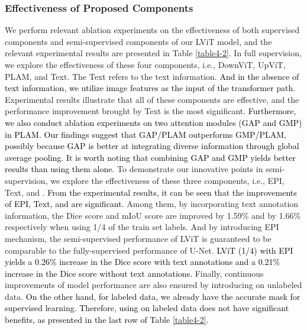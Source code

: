 \documentclass[lettersize,journal]{IEEEtran}
\begin{document}
\subsubsection{Effectiveness of Proposed Components}
We perform relevant ablation experiments on the effectiveness of both supervised components and semi-supervised components of our LViT model, and the relevant experimental results are presented in Table \ref{table4-2}. In full supervision, we explore the effectiveness of these four components, i.e., DownViT, UpViT, PLAM, and Text. The Text refers to the text information. 
\textcolor{black}{And in the absence of text information, we utilize image features as the input of the transformer path.}
Experimental results illustrate that all of these components are effective, and the performance improvement brought by Text is the most significant.
\textcolor{black}{
Furthermore, we also conduct ablation experiments on two attention modules (GAP and GMP) in PLAM. Our findings suggest that GAP/PLAM outperforms GMP/PLAM, possibly because GAP is better at integrating  diverse information through global average pooling. It is worth noting that combining GAP and GMP yields better results than using them alone.}
To demonstrate our innovative points in semi-supervision, we explore the effectiveness of these three components, i.e., EPI, Text, and . \textcolor{black}{From the experimental results, it can be seen that the improvements of EPI, Text, and  are significant.} Among them, by incorporating text annotation information, the Dice score and mIoU score are improved by 1.59\% and by 1.66\% respectively when using 1/4 of the train set labels. And by introducing EPI mechanism, the semi-supervised performance of LViT is guaranteed to be comparable to the fully-supervised performance of U-Net. \textcolor{black}{LViT (1/4) with EPI yields a 0.26\% increase in the Dice score with text annotations and a 0.21\% increase in the Dice score without text annotations.} Finally, continuous improvements of model performance are also ensured by introducing  on unlabeled data. 
\textcolor{black}{
On the other hand, for labeled data, we already have the accurate mask for supervised learning. Therefore, using  on labeled data does not have significant benefits, as presented in the last row of Table \ref{table4-2}.}
\vspace{-2mm}
\end{document}
